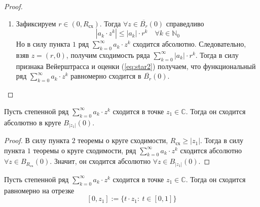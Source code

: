 \documentclass[11pt]{article}
\begin{document}
\begin{proof}
\begin{enumerate}
\begin{itemize}
            \item Рассмотрим загадочный ряд: $\displaystyle \sum_{k = 1}^{\infty} \frac{z^k}{k}$. $\quad R_{\text{сх}} = 1$, но если $z = (1, 0)$, то ряд $\displaystyle \sum_{k = 1}^{\infty} \frac{1}{k}$
            расходится. А если $z = (-1, 0)$, то ряд $\displaystyle \sum_{k = 1}^{\infty} \frac{(-1)^k}{k}$ сходится по признаку Лейбница.
        \end{itemize}

        \item Зафиксируем $r \in (0, R_{\text{сх}})$. Тогда $\forall z \in \overline{B_r}(0)$ справедливо \[|a_k \cdot z^k| \leq |a_k| \cdot r^k \quad \forall k \in 
        \mathbb{N}_0 \label{eq:star2} \tag{*}\] Но в силу пункта $1$ ряд $\displaystyle \sum_{k = 0}^{\infty} a_k \cdot z^k$ сходится абсолютно. Следовательно, 
        взяв $z = (r, 0)$, получим сходимость ряда $\displaystyle \sum_{k = 0}^{\infty} |a_k| \cdot r^k$. Тогда в силу признака Вейерштрасса и оценки (\ref{eq:star2})
        получаем, что функциональный ряд $\displaystyle \sum_{k = 0}^{\infty} a_k \cdot z^k$ равномерно сходится в $\overline{B_r}(0)$.
    \end{enumerate}
\end{proof}

\begin{theorem}
    Пусть степенной ряд $\displaystyle  \sum_{k = 0}^{\infty} a_k \cdot z^k$ сходится в точке $z_1 \in \mathbb{C}$. Тогда он сходится абсолютно в круге $B_{|z_1|}(0)$.
\end{theorem}

\begin{proof}
    В силу пункта $2$ теоремы о круге сходимости, $R_{\text{сх}} \geq |z_1|$. Тогда в силу пункта $1$ теоремы о круге сходимости, ряд $\displaystyle \sum_{k = 0}^{\infty} a_k \cdot z^k$ 
    сходится абсолютно $\forall z \in B_{R_{\text{сх}}}(0)$. Значит, он сходится абсолютно $\forall z \in B_{|z_1|}(0)$.
\end{proof}

\begin{theorem}
    Пусть степенной ряд $\displaystyle  \sum_{k = 0}^{\infty} a_k \cdot z^k$ сходится в точке $z_1 \in \mathbb{C}$. Тогда он сходится равномерно на отрезке 
    \[ [0, z_1] := \{t\cdot z_1: \ t \in [0, 1]\}\]
\end{theorem}
\end{document}
